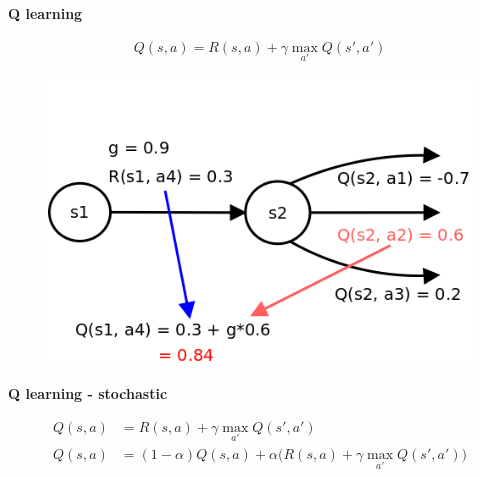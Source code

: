 \documentclass[xcolor=dvipsnames]{beamer}
\begin{document}
\begin{frame}{\bf Q learning}

\begin{align*}
Q(s, a) = R(s, a) + \gamma \max \limits_{a'} Q(s', a')
\end{align*}

\begin{figure}
  \includegraphics[scale=0.3]{../../diagrams/q_learning_detail.png}
\end{figure}

\end{frame}


\begin{frame}{\bf Q learning - stochastic}


\begin{align*}
Q(s, a) &= R(s, a) + \gamma \max \limits_{a'} Q(s', a') \\
Q(s, a) &= (1-\alpha)Q(s, a) + \alpha\Big(R(s, a) + \gamma \max \limits_{a'} Q(s', a')\Big)
\end{align*}


\end{frame}
\end{document}
